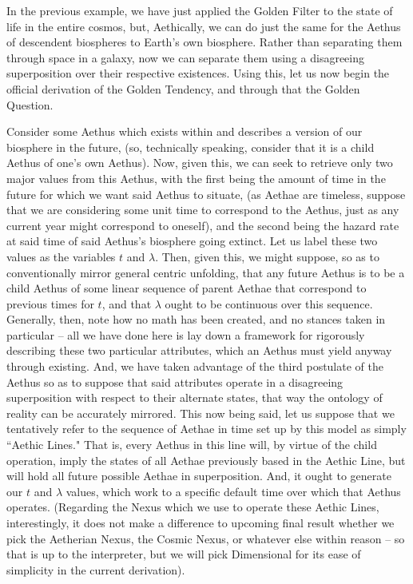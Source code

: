 In the previous example, we have just applied the Golden Filter to the state of life in the entire cosmos, but, Aethically, we can do just the same for the Aethus of descendent biospheres to Earth's own biosphere. Rather than separating them through space in a galaxy, now we can separate them using a disagreeing superposition over their respective existences. Using this, let us now begin the official derivation of the Golden Tendency, and through that the Golden Question. 

Consider some Aethus which exists within and describes a version of our biosphere in the future, (so, technically speaking, consider that it is a child Aethus of one's own Aethus). Now, given this, we can seek to retrieve only two major values from this Aethus, with the first being the amount of time in the future for which we want said Aethus to situate, (as Aethae are timeless, suppose that we are considering some unit time to correspond to the Aethus, just as any current year might correspond to oneself), and the second being the hazard rate at said time of said Aethus's biosphere going extinct. Let us label these two values as the variables $t$ and $\lambda$. Then, given this, we might suppose, so as to conventionally mirror general centric unfolding, that any future Aethus is to be a child Aethus of some linear sequence of parent Aethae that correspond to previous times for $t$, and that $\lambda$ ought to be continuous over this sequence. Generally, then, note how no math has been created, and no stances taken in particular -- all we have done here is lay down a framework for rigorously describing these two particular attributes, which an Aethus must yield anyway through existing. And, we have taken advantage of the third postulate of the Aethus so as to suppose that said attributes operate in a disagreeing superposition with respect to their alternate states, that way the ontology of reality can be accurately mirrored. This now being said, let us suppose that we tentatively refer to the sequence of Aethae in time set up by this model as simply ``Aethic Lines." That is, every Aethus in this line will, by virtue of the child operation, imply the states of all Aethae previously based in the Aethic Line, but will hold all future possible Aethae in superposition. And, it ought to generate our $t$ and $\lambda$ values, which work to a specific default time over which that Aethus operates. (Regarding the Nexus which we use to operate these Aethic Lines, interestingly, it does not make a difference to upcoming final result whether we pick the Aetherian Nexus, the Cosmic Nexus, or whatever else within reason -- so that is up to the interpreter, but we will pick Dimensional for its ease of simplicity in the current derivation).

